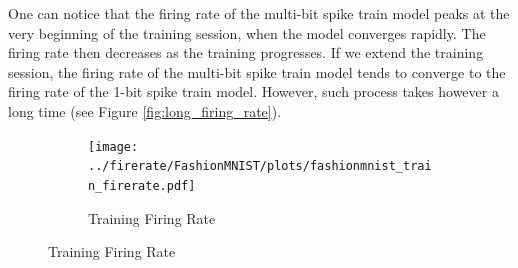     One can notice that the firing rate of the multi-bit spike train model peaks at the very beginning of the training session, when the model converges rapidly. The firing rate then decreases as the training progresses. If we extend the training session, the firing rate of the multi-bit spike train model tends to converge to the firing rate of the 1-bit spike train model. However, such process takes however a long time (see Figure \ref{fig:long_firing_rate}). 
    \begin{figure}[!htpb]
        \centering
        \begin{subfigure}[H]{0.9\textwidth}
            \centering
            \texttt{[image: ../firerate/FashionMNIST/plots/fashionmnist\_train\_firerate.pdf]}
            \caption{Training Firing Rate}
        \end{subfigure}
    \end{figure}
